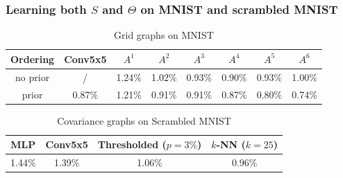 \documentclass[t,9pt,pdftex]{beamer}
\theoremstyle{definition}
\begin{document}



\begin{frame}[c, label=current]
  \frametitle{Learning both $S$ and $\Theta$ on MNIST and scrambled MNIST}
  \begin{table}[h]
  \begin{center}
    \bgroup
    \def\arraystretch{1.5}%
    \begin{tabular}{|c|c|c|c|c|c|c|c|}
      \hline
      Ordering & Conv5x5 & $A^1$ & $A^2$ & $A^3$ & $A^4$ & $A^5$ & $A^6$\\
      \hline
      no prior & / & 1.24\% & 1.02\% & 0.93\% & 0.90\% & 0.93\% & 1.00\%\\
      \hline
      prior & 0.87\% & 1.21\% & 0.91\% & 0.91\% & 0.87\% & 0.80\% & 0.74\%\\
      \hline
    \end{tabular}
    \egroup
  \end{center}
  \caption{Grid graphs on MNIST}
\end{table}
\pause
\begin{table}[h]
  \begin{center}
    \bgroup
    \def\arraystretch{1.5}%
    \begin{tabular}{|c|c|c|c|}
      \hline
      MLP & Conv5x5 & Thresholded ($p=3\%$) & $k$-NN ($k=25$)\\
      \hline
      1.44\% & 1.39\% & 1.06\% & 0.96\%\\
      \hline
    \end{tabular}
    \egroup
  \end{center}
  \caption{Covariance graphs on Scrambled MNIST}
  \end{table}
\end{frame}
\end{document}
